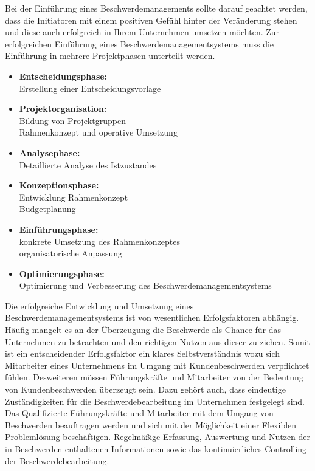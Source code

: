 \documentclass[a4paper,12pt]{article}
\begin{document}
	\noindent Bei der Einführung eines Beschwerdemanagements sollte darauf geachtet werden, dass die Initiatoren mit einem positiven Gefühl hinter der Veränderung stehen und diese auch erfolgreich in Ihrem Unternehmen umsetzen möchten.
	Zur erfolgreichen Einführung eines Beschwerdemanagementsystems muss die Einführung in mehrere Projektphasen unterteilt werden.
	
	\begin{itemize}
		\item \textbf{Entscheidungsphase:}\\
		Erstellung einer Entscheidungsvorlage
		
		\item \textbf{Projektorganisation:}\\
		Bildung von Projektgruppen\\
		Rahmenkonzept und operative Umsetzung
		
		\item \textbf{Analysephase:}\\
		Detaillierte Analyse des Istzustandes
		
		\item \textbf{Konzeptionsphase:}\\
		Entwicklung Rahmenkonzept\\
		Budgetplanung
		
		\item\textbf{Einführungsphase:}\\
		konkrete Umsetzung des Rahmenkonzeptes\\
		organisatorische Anpassung
		
		\item \textbf{Optimierungsphase:}\\
		Optimierung und Verbesserung des Beschwerdemanagementsystems
	\end{itemize}
	
	\noindent Die erfolgreiche Entwicklung und Umsetzung eines Beschwerdemanagementsystems ist von wesentlichen Erfolgsfaktoren abhängig. \\
	
	\noindent Häufig mangelt es an der Überzeugung die Beschwerde als Chance für das Unternehmen zu betrachten und den richtigen Nutzen aus dieser zu ziehen. Somit ist ein entscheidender Erfolgsfaktor ein klares Selbstverständnis wozu sich Mitarbeiter eines Unternehmens im Umgang mit Kundenbeschwerden verpflichtet fühlen. \noindent Desweiteren müssen Führungskräfte und Mitarbeiter von der Bedeutung von Kundenbeschwerden überzeugt sein. Dazu gehört auch, dass eindeutige Zuständigkeiten für die Beschwerdebearbeitung im Unternehmen festgelegt sind. Das Qualifizierte Führungskräfte und Mitarbeiter mit dem Umgang von Beschwerden beauftragen werden und sich mit der Möglichkeit einer Flexiblen Problemlösung beschäftigen. Regelmäßige Erfassung, Auswertung und Nutzen der in Beschwerden enthaltenen Informationen sowie das kontinuierliches Controlling der Beschwerdebearbeitung. \cite{Studpraes}\\
	
\end{document}
